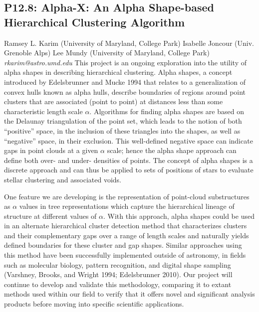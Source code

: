 \documentclass{report}
\begin{document}
\subsection*{P12.8: Alpha-X: An Alpha Shape-based Hierarchical Clustering Algorithm}
\bigskip
Ramsey L. Karim (University of Maryland, College Park) \newline Isabelle Joncour (Univ. Grenoble Alps) \newline  Lee Mundy (University of Maryland, College Park)\newline   \newline  \newline  \newline\newline
{\it rkarim@astro.umd.edu}\newline
\newline\newline
This project is an ongoing exploration into the utility of alpha shapes in describing hierarchical clustering. Alpha shapes, a concept introduced by Edelsbrunner and Mucke 1994 that relates to a generalization of convex hulls known as alpha hulls, describe boundaries of regions around point clusters that are associated (point to point) at distances less than some characteristic length scale $\alpha$. Algorithms for finding alpha shapes are based on the Delaunay triangulation of the point set, which leads to the notion of both “positive” space, in the inclusion of these triangles into the shapes, as well as “negative” space, in their exclusion. This well-defined negative space can indicate gaps in point clouds at a given $\alpha$ scale; hence the alpha shape approach can define both over- and under- densities of points. The concept of alpha shapes is a discrete approach and can thus be applied to sets of positions of stars to evaluate stellar clustering and associated voids.

One feature we are developing is the representation of point-cloud substructures as $\alpha$ values in tree representations which capture the hierarchical lineage of structure at different values of $\alpha$. With this approach, alpha shapes could be used in an alternate hierarchical cluster detection method that characterizes clusters and their complementary gaps over a range of length scales and naturally yields defined boundaries for these cluster and gap shapes. Similar approaches using this method have been successfully implemented outside of astronomy, in fields such as molecular biology, pattern recognition, and digital shape sampling (Varshney, Brooks, and Wright 1994; Edelsbrunner 2010). Our project will continue to develop and validate this methodology, comparing it to extant methods used within our field to verify that it offers novel and significant analysis products before moving into specific scientific applications.\newline
\newpage
\end{document}
